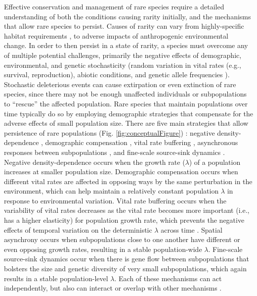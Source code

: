\documentclass[12pt, letterpaper]{article}
\begin{document}
Effective conservation and management of rare species require a detailed understanding of both the conditions causing rarity initially, and the mechanisms that allow rare species to persist. Causes of rarity can vary from highly-specific habitat requirements \cite{Sgarbi2018YouTime}, to adverse impacts of anthropogenic environmental change. In order to then persist in a state of rarity, a species must overcome any of multiple potential challenges, primarily the negative effects of demographic, environmental, and genetic stochasticity (random variation in vital rates (e.g., survival, reproduction), abiotic conditions, and genetic allele frequencies \cite{May1973StabilityEnvironments}). Stochastic deleterious events can cause extirpation or even extinction of rare species, since there may not be enough unaffected individuals or subpopulations to “rescue” the affected population\cite{Nei1975ThePopulations}. Rare species that maintain populations over time typically do so by employing demographic strategies that compensate for the adverse effects of small population size. There are five main strategies that allow persistence of rare populations (Fig. \ref{fig:conceptualFigure}) \cite{Dibner2019}: negative density-dependence \cite{Rovere2019PersistentlyAvoid}, demographic compensation \cite{Villellas2015DemographicImplications}, vital rate buffering \cite{Pfister1998PatternsImplications, Hilde2020TheChallenges}, asynchronous responses between subpopulations \cite{Abbott2017PortfolioWeberi}, and fine-scale source-sink dynamics \cite{Kauffman2004SpatialPopulation, Pulliam2016SourcesUse}. Negative density-dependence occurs when the growth rate ($\lambda$)  of a population increases at smaller population size. Demographic compensation occurs when different vital rates are affected in opposing ways by the same perturbation in the environment, which can help maintain a relatively constant population $\lambda$ in response to environmental variation. Vital rate buffering occurs when the variability of vital rates decreases as the vital rate becomes more important (i.e., has a higher elasticity) for population growth rate, which prevents the negative effects of temporal variation on the deterministic $\lambda$ across time \cite{Tuljapurkar1989An.}. Spatial asynchrony occurs when subpopulations close to one another have different or even opposing growth rates, resulting in a stable population-wide $\lambda$. Fine-scale source-sink dynamics occur when there is gene flow between subpopulations that bolsters the size and genetic diversity of very small subpopulations, which again results in a stable population-level $\lambda$. Each of these mechanisms can act independently, but also can interact or overlap with other mechanisms \cite{Dibner2019}.  
\end{document}
